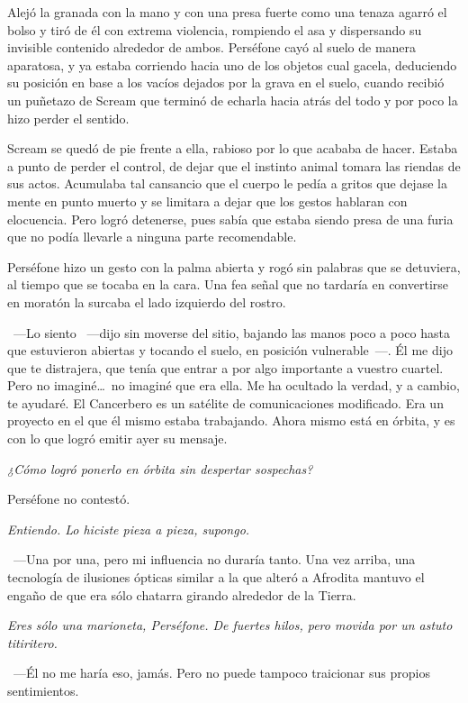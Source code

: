 Alejó la granada con la mano y con una presa fuerte como una tenaza agarró el bolso y tiró de él con extrema violencia, rompiendo el asa y dispersando su invisible contenido alrededor de ambos. Perséfone cayó al suelo de manera aparatosa, y ya estaba corriendo hacia uno de los objetos cual gacela, deduciendo su posición en base a los vacíos dejados por la grava en el suelo, cuando recibió un puñetazo de Scream que terminó de echarla hacia atrás del todo y por poco la hizo perder el sentido.

Scream se quedó de pie frente a ella, rabioso por lo que acababa de hacer. Estaba a punto de perder el control, de dejar que el instinto animal tomara las riendas de sus actos. Acumulaba tal cansancio que el cuerpo le pedía a gritos que dejase la mente en punto muerto y se limitara a dejar que los gestos hablaran con elocuencia. Pero logró detenerse, pues sabía que estaba siendo presa de una furia que no podía llevarle a ninguna parte recomendable.

Perséfone hizo un gesto con la palma abierta y rogó sin palabras que se detuviera, al tiempo que se tocaba en la cara. Una fea señal que no tardaría en convertirse en moratón la surcaba el lado izquierdo del rostro.

~---Lo siento ~---dijo sin moverse del sitio, bajando las manos poco a poco hasta que estuvieron abiertas y tocando el suelo, en posición vulnerable~---. Él me dijo que te distrajera, que tenía que entrar a por algo importante a vuestro cuartel. Pero no imaginé\dots\ no imaginé que era ella. Me ha ocultado la verdad, y a cambio, te ayudaré. El Cancerbero es un satélite de comunicaciones modificado. Era un proyecto en el que él mismo estaba trabajando. Ahora mismo está en órbita, y es con lo que logró emitir ayer su mensaje.

\emph{¿Cómo logró ponerlo en órbita sin despertar sospechas?}

Perséfone no contestó.

\emph{Entiendo. Lo hiciste pieza a pieza, supongo.}

~---Una por una, pero mi influencia no duraría tanto. Una vez arriba, una tecnología de ilusiones ópticas similar a la que alteró a Afrodita mantuvo el engaño de que era sólo chatarra girando alrededor de la Tierra.

\emph{Eres sólo una marioneta, Perséfone. De fuertes hilos, pero movida por un astuto titiritero.}

~---Él no me haría eso, jamás. Pero no puede tampoco traicionar sus propios sentimientos.

